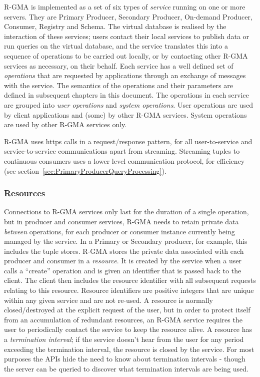 R-GMA is implemented as a set of six types of \textit{service} running on one or
more servers. They are Primary Producer, Secondary Producer, On-demand Producer,
Consumer, Registry and Schema.  The virtual database is realised by the
interaction of these services; users contact their local services to publish data
or run queries on the virtual database, and the service translates this into a
sequence of operations to be carried out locally, or by contacting other R-GMA
services as necessary, on their behalf. Each service has a well defined set of
\textit{operations} that are requested by applications through an exchange of
messages with the service. The semantics of the operations and their parameters
are defined in  subsequent chapters in this  document. The operations in each
service are grouped into \textit{user operations} and \textit{system operations}.
User operations are used by client applications and (some) by other R-GMA
services. System operations are used by other R-GMA services only.

R-GMA uses https calls in a request/response pattern, for all user-to-service 
and service-to-service communications apart from streaming.  Streaming tuples 
to continuous consumers uses a lower level communication protocol, for 
efficiency (see section~\ref{sec:PrimaryProducerQueryProcessing}).

\subsubsection{Resources}

Connections to R-GMA services only last for the duration of a single
operation, but in producer and consumer services, R-GMA needs to
retain private data \textit{between} operations, for each producer or
consumer instance currently being managed by the service. In a Primary
or Secondary producer, for example, this includes the tuple
stores.  R-GMA stores the private data
associated with each producer and consumer in a \textit{resource}. It
is created by the service when a user calls a ``create'' operation and
is given an identifier that is passed back to the client. The client
then includes the resource identifier with all subsequent requests
relating to this resource. Resource identifiers are positive integers
that are unique within any given service and are not re-used.  A
resource is normally closed/destroyed at the explicit request of the user,
but in order to protect itself from an accumulation of redundant
resources, an R-GMA service requires the user to periodically contact
the service to keep the resource alive. A resource has a 
\textit{termination interval};  if the service doesn't hear
from the user for any period exceeding the termination interval, the resource is
closed by the service. For most purposes the APIs hide the need to know about
termination intervals - though the server can be queried to discover what
termination intervals are being used.

